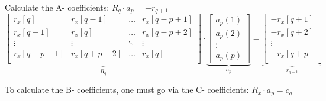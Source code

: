 \begin{aufzaehlung}
			\item Calculate the A- coefficients: $R_q \cdot a_p = - r_{q+1}$
			\small$$
\underbrace{\begin{bmatrix}                   
			r_x[q] & r_x[q-1] & \hdots & r_x[q-p+1] \\   
			r_x[q+1] & r_x[q] & \hdots & r_x[q-p+2] \\    
			\vdots & \vdots & \ddots & \vdots \\     
			r_x[q+p-1] & r_x[q+p-2] & \hdots & r_x[q] \\ 
		\end{bmatrix}  }_{R_q} \cdot \underbrace{\begin{bmatrix}
			a_p(1) \\
			a_p(2) \\
			\vdots \\
			a_p(p)
		\end{bmatrix}  }_{a_p}= \underbrace{\begin{bmatrix}
				-r_x[q+1]\\            
				-r_x[q+2]\\
			\vdots \\
				-r_x[q+p]\\
		\end{bmatrix}}_{r_{q+1}} 
			$$ \normalsize
			\item To calculate the B- coefficients, one must go via the C- coefficients: $R_x \cdot a_p = c_q$
	

\end{aufzaehlung}
